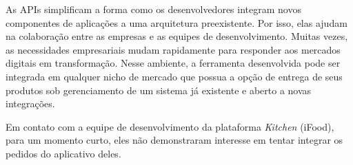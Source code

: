 As APIs simplificam a forma como os desenvolvedores integram novos componentes de aplicações a uma arquitetura preexistente. Por isso, elas ajudam na colaboração entre as empresas e as equipes de desenvolvimento. Muitas vezes, as necessidades empresariais mudam rapidamente para responder aos mercados digitais em transformação. Nesse ambiente, a ferramenta desenvolvida pode ser integrada em qualquer nicho de mercado que possua a opção de entrega de seus produtos sob gerenciamento de um sistema já existente e aberto a novas integrações.

Em contato com a equipe de desenvolvimento da plataforma \textit{Kitchen} (iFood), para um momento curto, eles não demonstraram interesse em tentar integrar os pedidos do aplicativo deles.